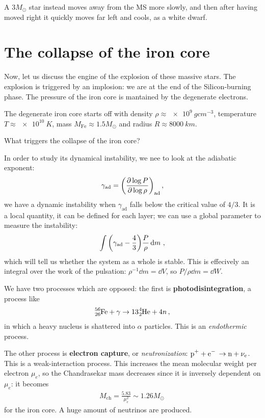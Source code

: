 \documentclass[main.tex]{subfiles}
\begin{document}
A \(3 M_{\odot}\) star instead moves away from the MS more slowly, and then after having moved right it quickly moves far left and cools, as a white dwarf. 

\section{The collapse of the iron core}

Now, let us discuss the engine of the explosion of these massive stars. The explosion is triggered by an implosion: we are at the end of the Silicon-burning phase. 
The pressure of the iron core is mantained by the degenerate electrons. 

The degenerate iron core starts off with density \(\rho \approx
\SI{e9}{g cm^{-3}}\), temperature \(T \approx \SI{e10}{K}\), mass \(M _{\text{Fe}} \approx \num{1.5} M_{\odot}\) and radius \(R \approx \SI{8000}{km}\). 

What triggers the collapse of the iron core? 

In order to study its dynamical instability, we nee to look at the adiabatic exponent:
%
\begin{align}
  \gamma _{\text{ad}} = \qty(\pdv{\log P}{\log \rho })_{\text{ad}}
\,,
\end{align}
%
we have a dynamic instability when  \(\gamma _{\text{ad}}\) falls below the critical value of \(4/3\). 
It is a local quantity, it can be defined for each layer; we can use a global parameter to measure the instability: 
%
\begin{align}
  \int \qty(\gamma _{\text{ad}} - \frac{4}{3}) \frac{P}{\rho } \dd{m}
\,,
\end{align}
%
which will tell us whether the system as a whole is stable. 
This is effecively an integral over the work of the pulsation: \(\rho^{-1} \dd{m} = \dd{V}\), so \(P/\rho \dd{m} = \dd{W}\).

We have two processes which are opposed: the first is \textbf{photodisintegration}, a process like 
%
\begin{align}
\ce{^{56}_{26}Fe} + \gamma \rightarrow 
13 \ce{^{4}_{2}He} + 4n
\,,
\end{align}
%
in which a heavy nucleus is shattered into \(\alpha \) particles. This is an \emph{endothermic} process.

The other process is \textbf{electron capture}, or \emph{neutronization}: \(\ce{p+ + e- \rightarrow n +} \nu_{e}\).
This is a weak-interaction process.
This increases the mean molecular weight per electron \(\mu_{e}\), so the Chandrasekar mass decreases since it is inversely dependent on \(\mu_{e}\): it becomes
%
\begin{align}
M _{\text{ch}} = \frac{5.83}{\mu_{e}^2} \sim 1.26 M_{\odot}
\,
\end{align}
%
for the iron core.
A huge amount of neutrinos are produced. 
\end{document}
